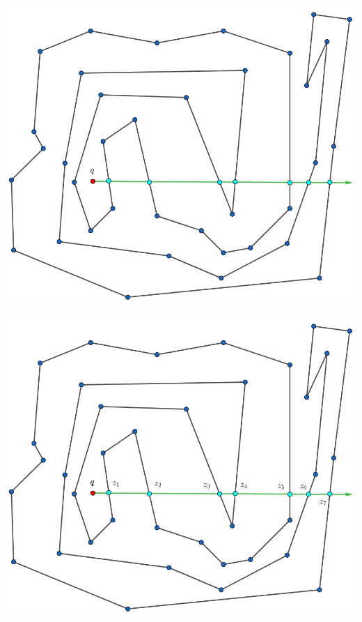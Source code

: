 \begin{frame}
  \centering \includegraphics[width=0.45 \paperwidth]{images/Poda/4.png}
\end{frame}

\begin{frame}
  \centering \includegraphics[width=0.45 \paperwidth]{images/Poda/5.png}
\end{frame}

